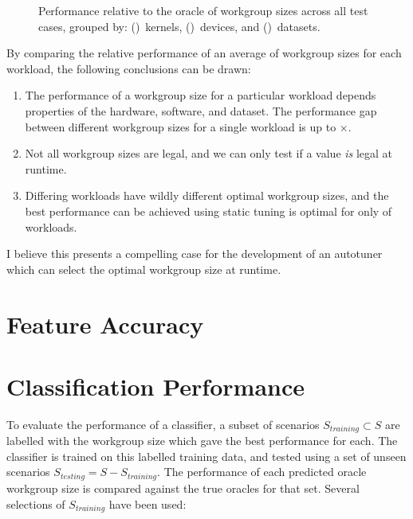 \begin{figure}

\caption{%
  Performance relative to the oracle of workgroup sizes across all
  test cases, grouped by: ()~kernels,
  ()~devices, and
  ()~datasets.%
}
\label{fig:performances}
\end{figure}

By comparing the relative performance of an average of
 workgroup sizes for each workload, the
following conclusions can be drawn:

\begin{enumerate}
\item The performance of a workgroup size for a particular workload
  depends properties of the hardware, software, and dataset. The
  performance gap between different workgroup sizes for a single
  workload is up to $\times$.
\item Not all workgroup sizes are legal, and we can only test if a
  value \emph{is} legal at runtime.
\item Differing workloads have wildly different optimal workgroup
  sizes, and the best performance can be achieved using static tuning
  is optimal for only  of
  workloads.
\end{enumerate}

I believe this presents a compelling case for the development of an
autotuner which can select the optimal workgroup size at runtime.


\section{Feature Accuracy}



\section{Classification Performance}

To evaluate the performance of a classifier, a subset of scenarios
$S_{training} \subset S$ are labelled with the workgroup size which
gave the best performance for each. The classifier is trained on this
labelled training data, and tested using a set of unseen scenarios
$S_{testing} = S - S_{training}$. The performance of each predicted
oracle workgroup size is compared against the true oracles for that
set. Several selections of $S_{training}$ have been used:

